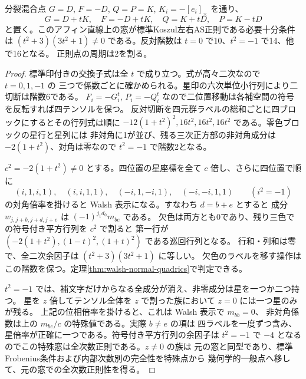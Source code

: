 \begin{proposition}\label{prop:split-mixed-transverse-curve}
分裂混合点 $G=D$, $F=-D$, $Q=P=K$, $K_i=-[e_i]_\times$ を通り、
\[
             G=D+tK,\quad F=-D+tK,\quad Q=K+tD,\quad P=K-tD
\]
と置く。このアフィン直線上の窓が標準Koszul左右AS正則である必要十分条件は
$(t^2+3)(3t^2+1)\ne0$ である。反対階数は $t=0$ で10、$t^2=-1$ で14、他で16となる。
正則点の周期は2を割る。
\end{proposition}
\begin{proof}
標準印付きの交換子式は全 $t$ で成り立つ。式が高々二次なので $t=0,1,-1$ の
三つで係数ごとに確かめられる。星印の六次単位小行列により二切断は階数6である。
$F_i=-G_i^t$, $P_i=-Q_i^t$ なので二位置移動は各補空間の符号を反転すれば四テンソルを保つ。
反対切断を四元群ラベルの総和ごとに四ブロックにするとその行列式は順に
$-12(1+t^2)^2,16t^2,16t^2,16t^2$ である。零色ブロックの星行と星列には
非対角に1が並び、残る三次正方部の非対角成分は $-2(1+t^2)$、対角は零なので $t^2=-1$ で階数2となる。

$c^2=-2(1+t^2)\ne0$ とする。四位置の星座標を全て $c$ 倍し、さらに四位置で順に
\[
 (i,1,i,1),\quad (i,i,1,1),\quad (-i,1,-i,1),\quad (-i,-i,1,1)
 \qquad (i^2=-1)
\]
の対角倍率を掛けると Walsh 表示になる。すなわち $d=b+e$ とすると
成分 $w_{j,j+b,j+d,j+e}$ は $(-1)^{j_1d_0} m_{be}$ である。
欠色は両方とも0であり、残り三色での符号付き平方行列を $c^2$ で割ると
第一行が $(-2(1+t^2),(1-t)^2,(1+t)^2)$ である巡回行列となる。
行和・列和は零で、全二次余因子は $(t^2+3)(3t^2+1)$ に等しい。
欠色のラベルを移す操作はこの階数を保つ。定理\ref{thm:walsh-normal-quadrics}で判定できる。

$t^2=-1$ では、補文字だけからなる全成分が消え、非零成分は星を一つか二つ持つ。
星を $z$ 倍してテンソル全体を $z$ で割った族において $z=0$ には一つ星のみが残る。
上記の位相倍率を掛けると、これは Walsh 表示で $m_{bb}=0$、
非対角係数は上の $m_{be}/c$ の特殊値である。実際 $b\ne e$ の項は
四ラベルを一度ずつ含み、星倍率が正確に一つである。符号付き平方行列の余因子は
$t^2=-1$ で $-4$ となるのでこの特殊窓は全次数正則である。$z\ne0$ の族は
元の窓と同型であり、標準Frobenius条件および内部次数別の完全性を特殊点から
幾何学的一般点へ移して、元の窓での全次数正則性を得る。
\end{proof}

